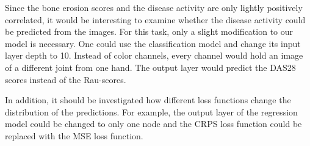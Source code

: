 \documentclass[12pt]{article}
\begin{document}
Since the bone erosion scores and the disease activity are only lightly positively correlated, it would be interesting to examine whether the disease activity could be predicted from the images. For this task, only a slight modification to our model is necessary. One could use the classification model and change its input layer depth to 10. Instead of color channels, every channel would hold an image of a different joint from one hand. The output layer would predict the DAS28 scores instead of the Rau-scores.

In addition, it should be investigated how different loss functions change the distribution of the predictions. For example, the output layer of the regression model could be changed to only one node and the CRPS loss function could be replaced with the MSE loss function.

\newpage
\printbibliography

\newpage
\listoffigures

\newpage
\listoftables
\end{document}
